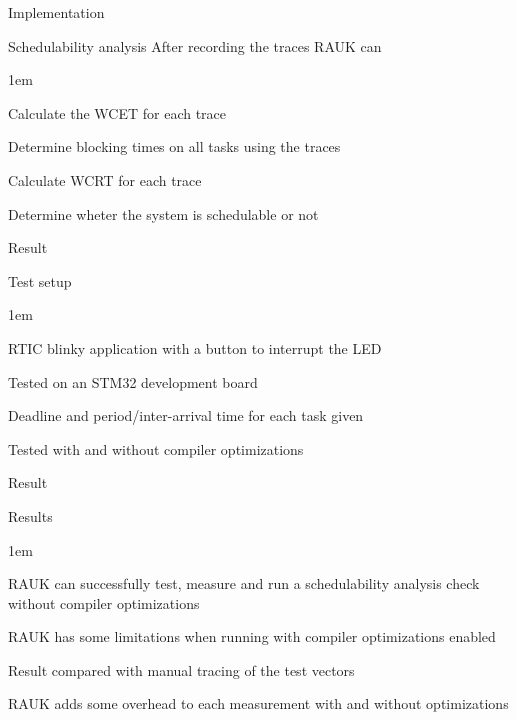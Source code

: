 \begin{frame}{Implementation}
    \begin{block}{Schedulability analysis}
        After recording the traces RAUK can
        \begin{itemize-size}{1em}
            \vspace{0.5em}
            \item Calculate the WCET for each trace
            \item Determine blocking times on all tasks using the traces
            \item Calculate WCRT for each trace
            \item Determine wheter the system is schedulable or not
        \end{itemize-size}  
    \end{block}
\end{frame}

\begin{frame}{Result}
    \begin{block}{Test setup}
        \begin{itemize-size}{1em}
            \item RTIC blinky application with a button to interrupt the LED
            \item Tested on an STM32 development board
            \item Deadline and period/inter-arrival time for each
            task given
            \item Tested with and without compiler optimizations
        \end{itemize-size}
    \end{block}
\end{frame}

\begin{frame}{Result}
    \begin{block}{Results}
        \begin{itemize-size}{1em}
            \item RAUK can successfully test, measure and
            run a schedulability analysis check without compiler optimizations
            \item RAUK has some limitations when running with compiler optimizations
            enabled
            \item Result compared with manual tracing of the test vectors
            \item RAUK adds some overhead to each measurement with and without
            optimizations
        \end{itemize-size}
    \end{block}
\end{frame}

